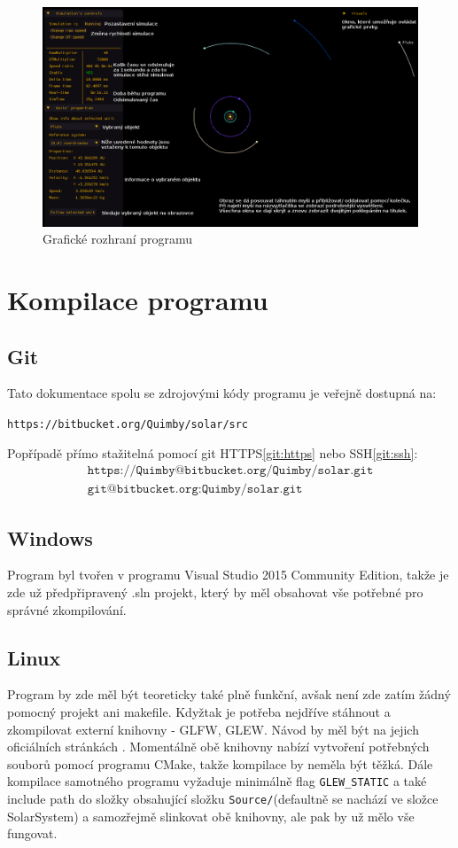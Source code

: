 \begin{figure}[b!]
	\caption{Grafické rozhraní programu}
	\label{fig:GUI1} 
	\centering
	\includegraphics[scale=0.5]{Figs/GUI1_edited}
\end{figure}
\FloatBarrier
\chapter{Kompilace programu}
\label{chap:kompilace}
\section{Git}
Tato dokumentace spolu se zdrojovými kódy programu je veřejně dostupná na:
\begin{center}
\texttt{https://bitbucket.org/Quimby/solar/src}
\end{center}
Popřípadě přímo stažitelná pomocí git HTTPS\eqref{git:https} nebo SSH\eqref{git:ssh}:
\begin{align}
	\label{git:https}
	\texttt{https://Quimby@bitbucket.org/Quimby/solar.git}\\
	\label{git:ssh}
	\texttt{git@bitbucket.org:Quimby/solar.git}
\end{align}
\section{Windows}
Program byl tvořen v programu Visual Studio 2015 Community Edition, takže je zde už předpřipravený .sln projekt, který by měl obsahovat vše potřebné pro správné zkompilování.
\section{Linux}
Program by zde měl být teoreticky také plně funkční, avšak není zde zatím žádný pomocný projekt ani makefile. Kdyžtak je potřeba nejdříve stáhnout a zkompilovat externí knihovny - GLFW, GLEW. Návod by měl být na jejich oficiálních stránkách . Momentálně obě knihovny nabízí vytvoření potřebných souborů pomocí programu CMake, takže kompilace by neměla být těžká. Dále kompilace samotného programu vyžaduje minimálně flag \texttt{GLEW\_STATIC} a také include path do složky obsahující složku \texttt{Source/}(defaultně se nachází ve složce SolarSystem) a samozřejmě slinkovat obě knihovny, ale pak by už mělo vše fungovat. 